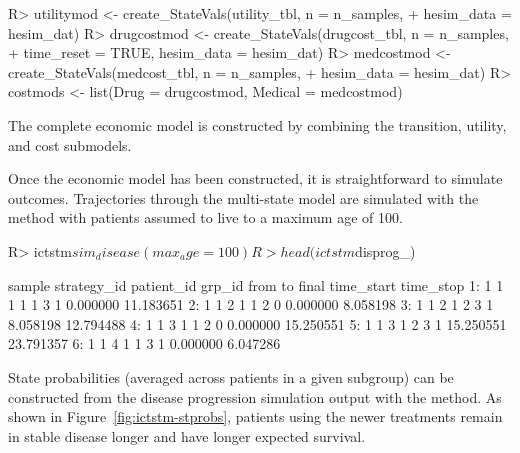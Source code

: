 \documentclass[article, nojss]{jss}\usepackage[]{graphicx}\usepackage[]{color}
\begin{document}
\begin{Schunk}
\begin{Sinput}
R> utilitymod <- create_StateVals(utility_tbl, n = n_samples, 
+    hesim_data = hesim_dat)
R> drugcostmod <- create_StateVals(drugcost_tbl, n = n_samples,
+    time_reset = TRUE, hesim_data = hesim_dat)
R> medcostmod <- create_StateVals(medcost_tbl, n = n_samples,
+    hesim_data = hesim_dat)
R> costmods <- list(Drug = drugcostmod, Medical = medcostmod)
\end{Sinput}
\end{Schunk}

The complete economic model is constructed by combining the transition, utility, and cost submodels.

\begin{Schunk}
\end{Schunk}

Once the economic model has been constructed, it is straightforward to simulate outcomes. Trajectories through the multi-state model are simulated with the  method with patients assumed to live to a maximum age of 100.

\begin{Schunk}
\begin{Sinput}
R> ictstm$sim_disease(max_age = 100)
R> head(ictstm$disprog_)
\end{Sinput}
\begin{Soutput}
   sample strategy_id patient_id grp_id from to final time_start time_stop
1:      1           1          1      1    1  3     1   0.000000 11.183651
2:      1           1          2      1    1  2     0   0.000000  8.058198
3:      1           1          2      1    2  3     1   8.058198 12.794488
4:      1           1          3      1    1  2     0   0.000000 15.250551
5:      1           1          3      1    2  3     1  15.250551 23.791357
6:      1           1          4      1    1  3     1   0.000000  6.047286
\end{Soutput}
\end{Schunk}

State probabilities (averaged across patients in a given subgroup) can be constructed from the disease progression simulation output with the  method. As shown in Figure~\ref{fig:ictstm-stprobs}, patients using the newer treatments remain in stable disease longer and have longer expected survival.  
\end{document}
